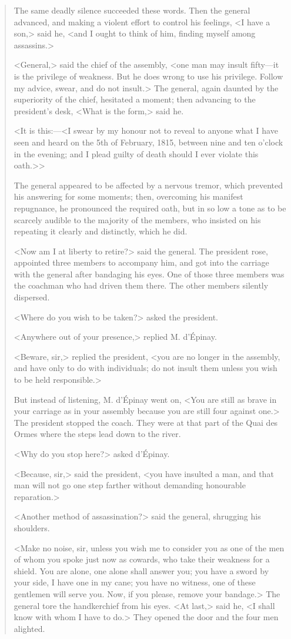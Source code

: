 \begin{quotation}
The same deadly silence succeeded these words. Then the general advanced, and making a violent effort to control his feelings, <I have a son,> said he, <and I ought to think of him, finding myself among assassins.> 

<General,> said the chief of the assembly, <one man may insult fifty—it is the privilege of weakness. But he does wrong to use his privilege. Follow my advice, swear, and do not insult.> The general, again daunted by the superiority of the chief, hesitated a moment; then advancing to the president's desk, <What is the form,> said he. 

<It is this:—<I swear by my honour not to reveal to anyone what I have seen and heard on the 5th of February, 1815, between nine and ten o'clock in the evening; and I plead guilty of death should I ever violate this oath.>>

The general appeared to be affected by a nervous tremor, which prevented his answering for some moments; then, overcoming his manifest repugnance, he pronounced the required oath, but in so low a tone as to be scarcely audible to the majority of the members, who insisted on his repeating it clearly and distinctly, which he did. 

<Now am I at liberty to retire?> said the general. The president rose, appointed three members to accompany him, and got into the carriage with the general after bandaging his eyes. One of those three members was the coachman who had driven them there. The other members silently dispersed. 

<Where do you wish to be taken?> asked the president. 

<Anywhere out of your presence,> replied M. d'Épinay. 

<Beware, sir,> replied the president, <you are no longer in the assembly, and have only to do with individuals; do not insult them unless you wish to be held responsible.> 

But instead of listening, M. d'Épinay went on, <You are still as brave in your carriage as in your assembly because you are still four against one.> The president stopped the coach. They were at that part of the Quai des Ormes where the steps lead down to the river. 

<Why do you stop here?> asked d'Épinay. 

<Because, sir,> said the president, <you have insulted a man, and that man will not go one step farther without demanding honourable reparation.> 

<Another method of assassination?> said the general, shrugging his shoulders. 

<Make no noise, sir, unless you wish me to consider you as one of the men of whom you spoke just now as cowards, who take their weakness for a shield. You are alone, one alone shall answer you; you have a sword by your side, I have one in my cane; you have no witness, one of these gentlemen will serve you. Now, if you please, remove your bandage.> The general tore the handkerchief from his eyes. <At last,> said he, <I shall know with whom I have to do.> They opened the door and the four men alighted.
\end{quotation}


